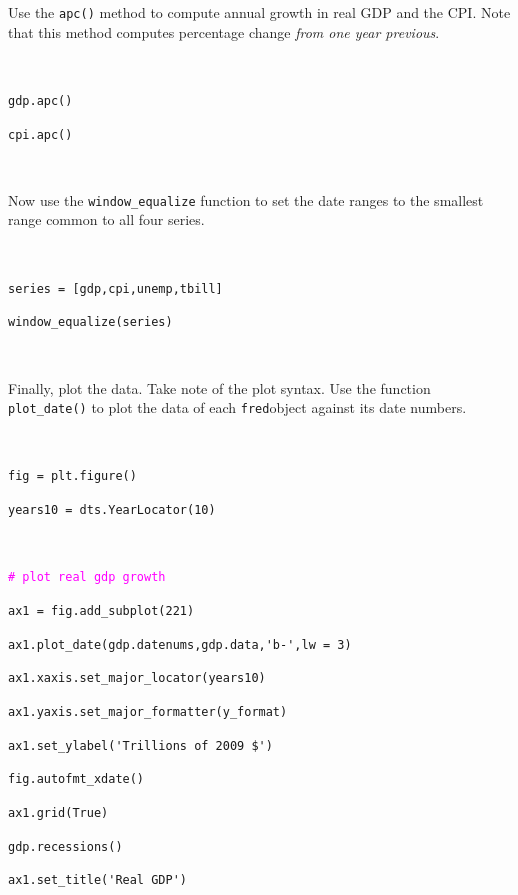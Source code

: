 \documentclass[11pt,fleqn]{article}
\newcommand{\ttt}{\texttt}
\newcommand{\tc}{\textcolor}
\begin{document}
\noindent Use the \ttt{apc()} method to compute annual growth in real GDP and the CPI. Note that this method computes percentage change \emph{from one year previous}.

\

\begin{minipage}{6.5in}
\ttt{gdp.apc()}

\ttt{cpi.apc()}

\

\end{minipage}

\noindent Now use the \ttt{window\_equalize} function to set the date ranges to the smallest range common to all four series.

\

\begin{minipage}{6.5in}
\ttt{series = [gdp,cpi,unemp,tbill]}

\ttt{window\_equalize(series)}

\

\end{minipage}

\noindent Finally, plot the data. Take note of the plot syntax. Use the function \verb!plot_date()! to plot the data of each \ttt{fred}object against its date numbers.

\

\begin{minipage}{6.5in}
\ttt{fig = plt.figure()}

\ttt{years10  = dts.YearLocator(10)}

\
\end{minipage}


\begin{minipage}{6.5in}
\ttt{\tc{Magenta}{\# plot real gdp growth}}

\ttt{ax1 = fig.add\_subplot(221)}

\verb!ax1.plot_date(gdp.datenums,gdp.data,'b-',lw = 3)!

\ttt{ax1.xaxis.set\_major\_locator(years10)}

\ttt{ax1.yaxis.set\_major\_formatter(y\_format)}

\verb!ax1.set_ylabel('Trillions of 2009 $')!

\ttt{fig.autofmt\_xdate()}

\ttt{ax1.grid(True)}

\ttt{gdp.recessions()}

\verb!ax1.set_title('Real GDP')!

\

\end{minipage}
\end{document}
